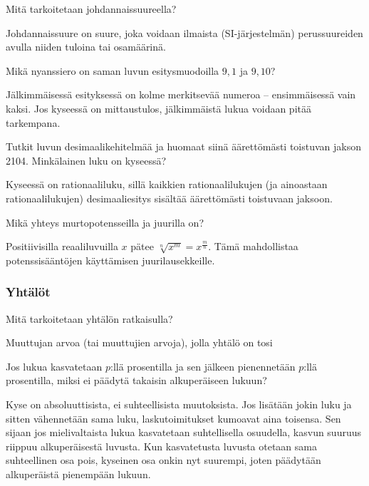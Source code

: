 \begin{tehtava}
Mitä tarkoitetaan johdannaissuureella?
\begin{vastaus}
Johdannaissuure on suure, joka voidaan ilmaista (SI-järjestelmän) perussuureiden avulla niiden tuloina tai osamäärinä.
\end{vastaus}
\end{tehtava}

\begin{tehtava}
Mikä nyanssiero on saman luvun esitysmuodoilla $9,1$ ja $9,10$?
\begin{vastaus}
Jälkimmäisessä esityksessä on kolme merkitsevää numeroa -- ensimmäisessä vain kaksi. Jos kyseessä on mittaustulos, jälkimmäistä lukua voidaan pitää tarkempana.
\end{vastaus}
\end{tehtava}

\begin{tehtava}
Tutkit luvun desimaalikehitelmää ja huomaat siinä äärettömästi toistuvan jakson 2104. Minkälainen luku on kyseessä?
\begin{vastaus}
Kyseessä on rationaaliluku, sillä kaikkien rationaalilukujen (ja ainoastaan rationaalilukujen) desimaaliesitys sisältää äärettömästi toistuvaan jaksoon.
\end{vastaus}
\end{tehtava}

\begin{tehtava}
Mikä yhteys murtopotensseilla ja juurilla on?
\begin{vastaus}
Positiivisilla reaaliluvuilla $x$ pätee $\sqrt[n]{x^m} = x^{\frac{m}{n}}$. Tämä mahdollistaa potenssisääntöjen käyttämisen juurilausekkeille.
\end{vastaus}
\end{tehtava}

\subsubsection*{Yhtälöt}

\begin{tehtava}
Mitä tarkoitetaan yhtälön ratkaisulla?
\begin{vastaus}
Muuttujan arvoa (tai muuttujien arvoja), jolla yhtälö on tosi
\end{vastaus}
\end{tehtava}

\begin{tehtava}
Jos lukua kasvatetaan $p$:llä prosentilla ja sen jälkeen pienennetään $p$:llä prosentilla, miksi ei päädytä takaisin alkuperäiseen lukuun?
	\begin{vastaus}
	Kyse on absoluuttisista, ei suhteellisista muutoksista. Jos lisätään jokin luku ja sitten vähennetään sama luku, laskutoimitukset kumoavat aina toisensa. Sen sijaan jos mielivaltaista lukua kasvatetaan suhtellisella osuudella, kasvun suuruus riippuu alkuperäisestä luvusta. Kun kasvatetusta luvusta otetaan sama suhteellinen osa pois, kyseinen osa onkin nyt suurempi, joten päädytään alkuperäistä pienempään lukuun.
	\end{vastaus}
\end{tehtava}


